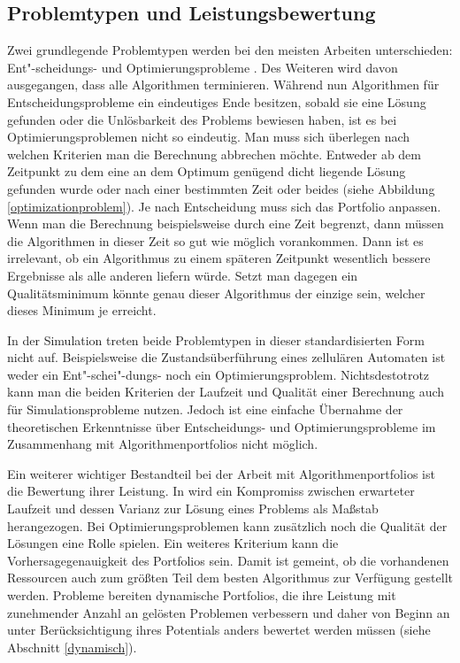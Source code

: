 \subsection{Problemtypen und Leistungsbewertung}

Zwei grundlegende Problemtypen werden bei den meisten Arbeiten unterschieden: Ent"-scheidungs- und Optimierungsprobleme \cite{gaglioloschmidhuber06, gomesselman97}. Des Weiteren wird davon ausgegangen, dass alle Algorithmen terminieren. Während nun Algorithmen für Entscheidungsprobleme ein eindeutiges Ende besitzen, sobald sie eine Lösung gefunden oder die Unlösbarkeit des Problems bewiesen haben, ist es bei Optimierungsproblemen nicht so eindeutig. Man muss sich überlegen nach welchen Kriterien man die Berechnung abbrechen möchte. Entweder ab dem Zeitpunkt zu dem eine an dem Optimum genügend dicht liegende Lösung gefunden wurde oder nach einer bestimmten Zeit oder beides (siehe Abbildung \ref{optimizationproblem}). Je nach Entscheidung muss sich das Portfolio anpassen. Wenn man die Berechnung beispielsweise durch eine Zeit begrenzt, dann müssen die Algorithmen in dieser Zeit so gut wie möglich vorankommen. Dann ist es irrelevant, ob ein Algorithmus zu einem späteren Zeitpunkt wesentlich bessere Ergebnisse als alle anderen liefern würde. Setzt man dagegen ein Qualitätsminimum könnte genau dieser Algorithmus der einzige sein, welcher dieses Minimum je erreicht.

In der Simulation treten beide Problemtypen in dieser standardisierten Form nicht auf. Beispielsweise die Zustandsüberführung eines zellulären Automaten ist weder ein Ent"-schei"-dungs- noch ein Optimierungsproblem. Nichtsdestotrotz kann man die beiden Kriterien der Laufzeit und Qualität einer Berechnung auch für Simulationsprobleme nutzen. Jedoch ist eine einfache Übernahme der theoretischen Erkenntnisse über Entscheidungs- und Optimierungsprobleme im Zusammenhang mit Algorithmenportfolios nicht möglich. 

Ein weiterer wichtiger Bestandteil bei der Arbeit mit Algorithmenportfolios ist die Bewertung ihrer Leistung. In \cite{gomesselman97} wird ein Kompromiss zwischen erwarteter Laufzeit und dessen Varianz zur Lösung eines Problems als Maßstab herangezogen. Bei Optimierungsproblemen kann zusätzlich noch die Qualität der Lösungen eine Rolle spielen. Ein weiteres Kriterium kann die Vorhersagegenauigkeit des Portfolios sein. Damit ist gemeint, ob die vorhandenen Ressourcen auch zum größten Teil dem besten Algorithmus zur Verfügung gestellt werden. Probleme bereiten dynamische Portfolios, die ihre Leistung mit zunehmender Anzahl an gelösten Problemen verbessern und daher von Beginn an unter Berücksichtigung ihres Potentials anders bewertet werden müssen (siehe Abschnitt \ref{dynamisch}).

